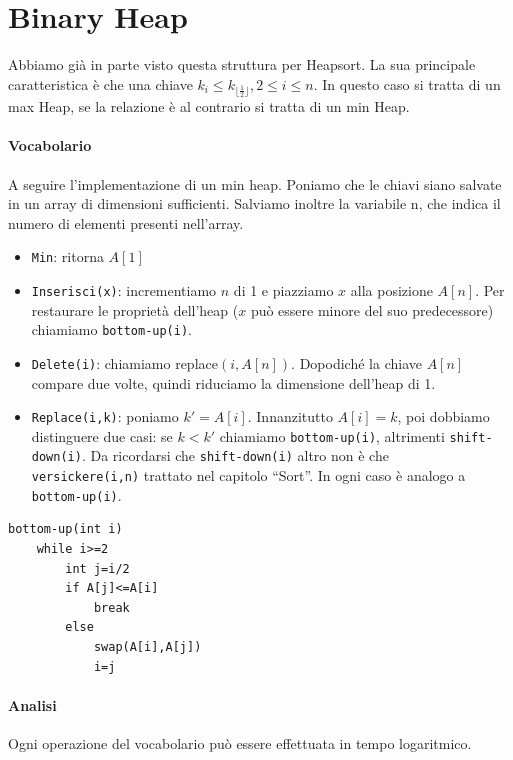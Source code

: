 \documentclass[a4paper]{book}
\newcommand{\inline}[1]{\lstinline!#1!}%
\newcommand{\lstIndent}{4}
\begin{document}
\section{Binary Heap}
Abbiamo già in parte visto questa struttura per Heapsort. La sua principale caratteristica è che una chiave $k_i \leq k_{\lfloor\frac{1}{2} \rfloor}, 2\leq i\leq n$. In questo caso si tratta di un max Heap, se la relazione è al contrario si tratta di un min Heap. 
\paragraph*{Vocabolario}
A seguire l'implementazione di un min heap. Poniamo che le chiavi siano salvate in un array di dimensioni sufficienti. Salviamo inoltre la variabile n, che indica il numero di elementi presenti nell'array.
\begin{itemize}
\item \inline{Min}: ritorna $A[1]$
\item \inline{Inserisci(x)}: incrementiamo $n$ di 1 e piazziamo $x$ alla posizione $A[n]$. Per restaurare le proprietà dell'heap ($x$ può essere minore del suo predecessore) chiamiamo \inline{bottom-up(i)}.
\item \inline{Delete(i)}: chiamiamo replace$(i,A[n])$. Dopodiché la chiave $A[n]$ compare due volte, quindi riduciamo la dimensione dell'heap di 1. 
\item \inline{Replace(i,k)}: poniamo $k'=A[i]$. Innanzitutto $A[i]=k$, poi dobbiamo distinguere due casi: se $k<k'$ chiamiamo \inline{bottom-up(i)}, altrimenti \inline{shift-down(i)}. Da ricordarsi che \inline{shift-down(i)} altro non è che \\\inline{versickere(i,n)} trattato nel capitolo ``Sort''. In ogni caso è analogo a \inline{bottom-up(i)}.
\end{itemize}
\begin{lstlisting}[tabsize=\lstIndent]
bottom-up(int i)
	while i>=2
		int j=i/2
		if A[j]<=A[i]
			break
		else
			swap(A[i],A[j])
			i=j	
\end{lstlisting}
\paragraph*{Analisi}
Ogni operazione del vocabolario può essere effettuata in tempo logaritmico.
\end{document}
